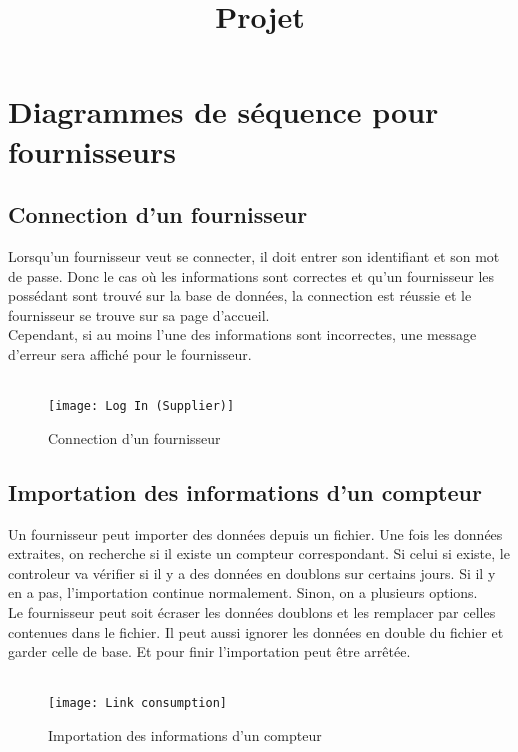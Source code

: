 \documentclass{report}
\begin{document}
\title{Projet}
\maketitle
\newpage
\section{Diagrammes de séquence pour fournisseurs}
\subsection{Connection d'un fournisseur}

Lorsqu'un fournisseur veut se connecter, il doit entrer son identifiant et son mot de passe. Donc le cas où les informations sont correctes et qu'un fournisseur les possédant sont trouvé sur la base de données, la connection est réussie et le fournisseur se trouve sur sa page d'accueil. \\
Cependant, si au moins l'une des informations sont incorrectes, une message d'erreur sera affiché pour le fournisseur.
\\
\\
\begin{figure}[h]
	\centering
	\texttt{[image: Log In (Supplier)]}
	\caption{Connection d'un fournisseur}
	\label{fig:login}
\end{figure}
\subsection{Importation des informations d'un compteur}

Un fournisseur peut importer des données depuis un fichier. Une fois les données extraites, on recherche si il existe un compteur correspondant. Si celui si existe, le controleur va vérifier si il y a des données en doublons sur certains jours. Si il y en a pas, l'importation continue normalement. Sinon, on a plusieurs options. \\
Le fournisseur peut soit écraser les données doublons et les remplacer par celles contenues dans le fichier. Il peut aussi ignorer les données en double du fichier et garder celle de base. Et pour finir l'importation peut être arrêtée.
\\
\\
\begin{figure}[h!]
    \centering
    \texttt{[image: Link consumption]}
    \caption{Importation des informations d'un compteur}
    \label{fig:linkConsumption}
\end{figure}
\end{document}
